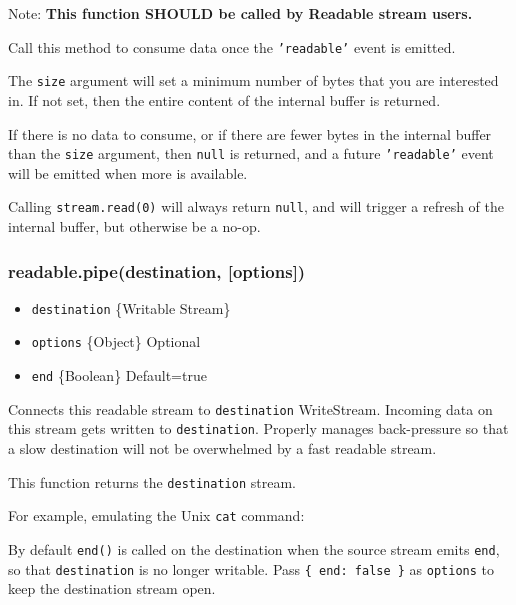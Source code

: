 Note: \textbf{This function SHOULD be called by Readable stream users.}

Call this method to consume data once the \texttt{'readable'} event is
emitted.

The \texttt{size} argument will set a minimum number of bytes that you
are interested in. If not set, then the entire content of the internal
buffer is returned.

If there is no data to consume, or if there are fewer bytes in the
internal buffer than the \texttt{size} argument, then \texttt{null} is
returned, and a future \texttt{'readable'} event will be emitted when
more is available.

Calling \texttt{stream.read(0)} will always return \texttt{null}, and
will trigger a refresh of the internal buffer, but otherwise be a no-op.

\subsubsection{readable.pipe(destination, {[}options{]})}

\begin{itemize}
\item
  \texttt{destination} \{Writable Stream\}
\item
  \texttt{options} \{Object\} Optional
\item
  \texttt{end} \{Boolean\} Default=true
\end{itemize}

Connects this readable stream to \texttt{destination} WriteStream.
Incoming data on this stream gets written to \texttt{destination}.
Properly manages back-pressure so that a slow destination will not be
overwhelmed by a fast readable stream.

This function returns the \texttt{destination} stream.

For example, emulating the Unix \texttt{cat} command:

\begin{Shaded}
\begin{Highlighting}[]
\NormalTok{(}\NormalTok{);}
\end{Highlighting}
\end{Shaded}

By default \texttt{end()} is called on the destination when the source
stream emits \texttt{end}, so that \texttt{destination} is no longer
writable. Pass \texttt{\{ end: false \}} as \texttt{options} to keep the
destination stream open.

